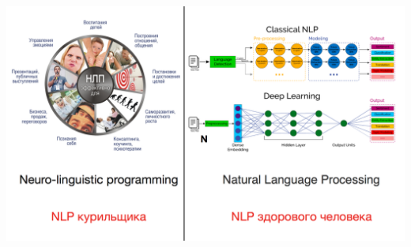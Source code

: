 \documentclass[notes,12pt, aspectratio=169]{beamer}
\begin{document}
{
	\begin{frame}
\end{frame}
}


{
	\begin{frame}
\end{frame}
}


\begin{frame}
\begin{center}
\includegraphics[width=0.8\paperwidth]{nlp5.png}
\end{center}
\end{frame}
\end{document}
